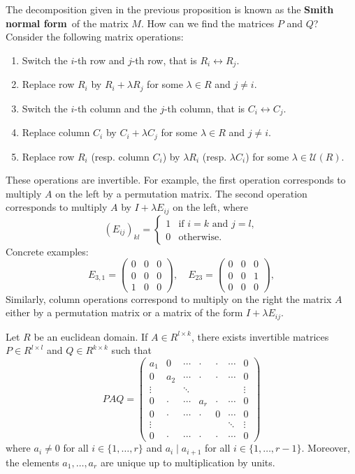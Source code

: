 The decomposition given in the previous proposition is known as 
the \textbf{Smith normal form} of the matrix $M$. 
How can we find the matrices $P$ and $Q$? 
Consider the following matrix operations: 
\begin{enumerate}
	\item Switch the $i$-th row and $j$-th row, that is $R_i\leftrightarrow R_j$.
	\item Replace row $R_i$ by $R_i+\lambda R_j$ for some $\lambda\in R$ and $j\ne i$.
	\item Switch the $i$-th column and the $j$-th column, that is $C_i\leftrightarrow C_j$.
	\item Replace column $C_i$ by $C_i+\lambda C_j$ for some $\lambda\in R$ and $j\ne i$. 
	\item Replace row $R_i$ (resp. column $C_i$) by $\lambda R_i$ (resp. $\lambda C_i$) 
	for some $\lambda\in\mathcal{U}(R)$. 
\end{enumerate}
These operations are invertible. For example, the first operation
corresponds to multiply $A$ on the left by a permutation matrix. 
The second
operation corresponds to multiply $A$ by $I+\lambda E_{ij}$ on the left, 
where 
\[
(E_{ij})_{kl}=\begin{cases}
1 & \text{if $i=k$ and $j=l$},\\
0 & \text{otherwise}.	
\end{cases}
\]
Concrete examples:
\[
E_{3,1}=
\begin{pmatrix}
    0 & 0 & 0\\
    0 & 0 & 0\\
    1 & 0 & 0
\end{pmatrix},
\quad
E_{23}=\begin{pmatrix}
    0 & 0 & 0\\
    0 & 0 & 1\\
    0 & 0 & 0
\end{pmatrix},
\]
Similarly, column operations correspond to multiply on the right the matrix $A$
either by a permutation matrix or a matrix of the form $I+\lambda E_{ij}$. 

\begin{theorem}
Let $R$ be an euclidean domain. If $A\in R^{l\times k}$,  
there exists invertible matrices $P\in R^{l\times l}$ and $Q\in R^{k\times k}$ such that 
\[
PAQ=\begin{pmatrix}
a_1 & 0 & \cdots & \cdot & \cdot & \cdots & 0\\
0 & a_2 & \cdots & \cdot & \cdot & \cdots & 0\\
\vdots && \ddots &  & & & \vdots\\	
0 & \cdot & \cdots & a_r & \cdot & \cdots & 0\\	
0 & \cdot & \cdots & \cdot & 0 & \cdots & 0\\	
\vdots &&&&&\ddots &\vdots\\
0 & \cdot & \cdots & \cdot & \cdot & \cdots & 0
\end{pmatrix}
\]
where $a_i\ne0$ for all $i\in\{1,\dots,r\}$ and $a_i\mid a_{i+1}$ for all $i\in\{1,\dots,r-1\}$.
Moreover, the elements $a_1,\dots,a_r$ are unique up to multiplication by
units. 
\end{theorem}

